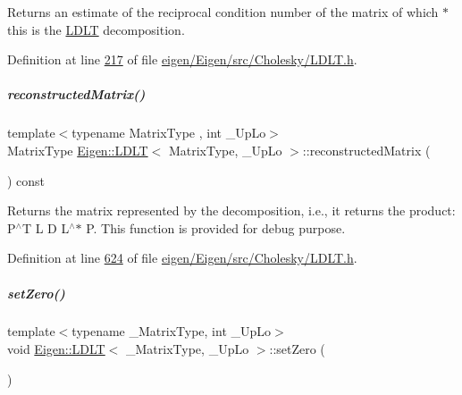 \begin{DoxyReturn}{Returns}
an estimate of the reciprocal condition number of the matrix of which {\ttfamily $\ast$this} is the \hyperlink{group___cholesky___module_class_eigen_1_1_l_d_l_t}{L\+D\+LT} decomposition. 
\end{DoxyReturn}


Definition at line \hyperlink{eigen_2_eigen_2src_2_cholesky_2_l_d_l_t_8h_source_l00217}{217} of file \hyperlink{eigen_2_eigen_2src_2_cholesky_2_l_d_l_t_8h_source}{eigen/\+Eigen/src/\+Cholesky/\+L\+D\+L\+T.\+h}.

\mbox{\label{group___cholesky___module_ae3693372ca29f50d87d324dfadaae148}} 
\subparagraph{\texorpdfstring{reconstructed\+Matrix()}{reconstructedMatrix()}}
{\footnotesize\ttfamily template$<$typename Matrix\+Type , int \+\_\+\+Up\+Lo$>$ \\
Matrix\+Type \hyperlink{group___cholesky___module_class_eigen_1_1_l_d_l_t}{Eigen\+::\+L\+D\+LT}$<$ Matrix\+Type, \+\_\+\+Up\+Lo $>$\+::reconstructed\+Matrix (\begin{DoxyParamCaption}{ }\end{DoxyParamCaption}) const}

\begin{DoxyReturn}{Returns}
the matrix represented by the decomposition, i.\+e., it returns the product\+: P$^\wedge$T L D L$^\wedge$$\ast$ P. This function is provided for debug purpose. 
\end{DoxyReturn}


Definition at line \hyperlink{eigen_2_eigen_2src_2_cholesky_2_l_d_l_t_8h_source_l00624}{624} of file \hyperlink{eigen_2_eigen_2src_2_cholesky_2_l_d_l_t_8h_source}{eigen/\+Eigen/src/\+Cholesky/\+L\+D\+L\+T.\+h}.

\mbox{\label{group___cholesky___module_a776d0ab6c980847297d25b03b5d2216a}} 
\subparagraph{\texorpdfstring{set\+Zero()}{setZero()}\hspace{0.1cm}{\footnotesize\ttfamily [1/2]}}
{\footnotesize\ttfamily template$<$typename \+\_\+\+Matrix\+Type, int \+\_\+\+Up\+Lo$>$ \\
void \hyperlink{group___cholesky___module_class_eigen_1_1_l_d_l_t}{Eigen\+::\+L\+D\+LT}$<$ \+\_\+\+Matrix\+Type, \+\_\+\+Up\+Lo $>$\+::set\+Zero (\begin{DoxyParamCaption}{ }\end{DoxyParamCaption})\hspace{0.3cm}{\ttfamily [inline]}}

